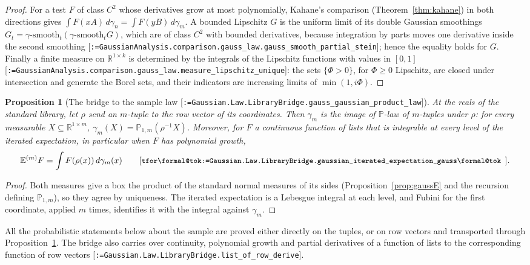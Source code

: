 \documentclass[11pt]{article}
\makeatletter
\newcommand{\formal@break}[1]{\@tfor\formal@tok:=#1\do{%
  \formal@tok
  \expandafter\ifx\formal@tok.\allowbreak\else
  \expandafter\ifx\formal@tok\_\allowbreak\fi\fi}}
\DeclareRobustCommand{\formal}[1]{\textnormal{[\texttt{\small\formal@break{#1}}]}}
\newcommand{\R}{\mathbb{R}}
\newcommand{\E}{\mathbb{E}}
\newcommand{\Prob}{\mathbb{P}}
\newcommand{\gauss}{\gamma}
\theoremstyle{plain}
\newtheorem{proposition}[theorem]{Proposition}
\theoremstyle{definition}
\makeatother
\begin{document}
\begin{proof}
For a test $F$ of class $C^2$ whose derivatives grow at most polynomially,
Kahane's comparison (Theorem~\ref{thm:kahane}) in both directions gives
$\int F(xA)\, d\gauss_n = \int F(yB)\, d\gauss_m$. A bounded Lipschitz $G$
is the uniform limit of its double Gaussian smoothings
$G_{t} = \gauss\text{-}\mathrm{smooth}_t(\gauss\text{-}\mathrm{smooth}_t G)$,
which are of class $C^2$ with bounded derivatives, because integration by
parts moves one derivative inside the second smoothing
\formal{GaussianAnalysis.comparison.gauss\_law.gauss\_smooth\_partial\_stein};
hence the equality holds for $G$. Finally a finite measure on
$\R^{1\times k}$ is determined by the integrals of the Lipschitz functions
with values in $[0,1]$ \formal{GaussianAnalysis.comparison.gauss\_law.measure\_lipschitz\_unique}:
the sets $\{\Phi > 0\}$, for $\Phi \ge 0$ Lipschitz, are closed under
intersection and generate the Borel sets, and their indicators are
increasing limits of $\min(1, i\Phi)$.
\end{proof}

\begin{proposition}[The bridge to the sample law \formal{Gaussian.Law.LibraryBridge.gauss\_gaussian\_product\_law}]\label{prop:bridge}
At the reals of the standard library, let $\rho$ send an $m$-tuple to the
row vector of its coordinates. Then $\gauss_m$ is the image of
$\Prob$-law of $m$-tuples under $\rho$: for every measurable $X \subseteq \R^{1\times m}$,
$\gauss_m(X) = \Prob_{1, m}(\rho^{-1} X)$. Moreover, for $F$ a continuous
function of lists that is integrable at every level of the iterated
expectation, in particular when $F$ has polynomial growth,
\[
\E^{(m)} F = \int F(\rho(x))\, d\gauss_m(x)
\tag*{\formal{Gaussian.Law.LibraryBridge.gaussian\_iterated\_expectation\_gauss}.}
\]
\end{proposition}

\begin{proof}
Both measures give a box the product of the standard normal measures of
its sides (Proposition~\ref{prop:gaussE} and the recursion defining
$\Prob_{1,m}$), so they agree by uniqueness. The iterated expectation is a
Lebesgue integral at each level, and Fubini for the first coordinate,
applied $m$ times, identifies it with the integral against $\gauss_m$.
\end{proof}

All the probabilistic statements below about the sample are proved either
directly on the tuples, or on row vectors and transported through
Proposition~\ref{prop:bridge}. The bridge also carries over continuity,
polynomial growth and partial derivatives of a function of lists to the
corresponding function of row vectors \formal{Gaussian.Law.LibraryBridge.list\_of\_row\_derive}.
\end{document}
